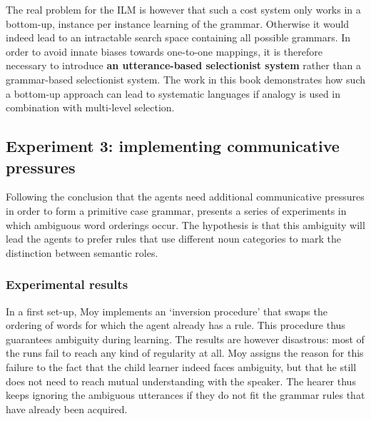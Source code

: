 The real problem for the ILM is however that such a cost system only works in a bottom-up, instance per instance learning of the grammar. Otherwise it would indeed lead to an intractable search space containing all possible grammars. In order to avoid innate biases towards one-to-one mappings, it is therefore necessary to introduce {\bfseries an utterance-based selectionist system} rather than a grammar-based selectionist system. The work in this book demonstrates how such a bottom-up approach can lead to systematic languages if analogy is used in combination with multi-level selection.

\subsection{Experiment 3: implementing communicative pressures}

Following the conclusion that the agents need additional communicative pressures in order to form a primitive case grammar, \citet[chapter 6]{moy06case} presents a series of experiments in which ambiguous word orderings occur. The hypothesis is that this ambiguity will lead the agents to prefer rules that use different noun categories to mark the distinction between semantic roles.


\subsubsection{Experimental results}
 In a first set-up, Moy implements an `inversion procedure' that swaps the ordering of words for which the agent already has a rule. This procedure thus guarantees ambiguity during learning. The results are however disastrous: most of the runs fail to reach any kind of regularity at all. Moy assigns the reason for this failure to the fact that the child learner indeed faces ambiguity, but that he still does not need to reach mutual understanding with the speaker. The hearer thus keeps ignoring the ambiguous utterances if they do not fit the grammar rules that have already been acquired.

